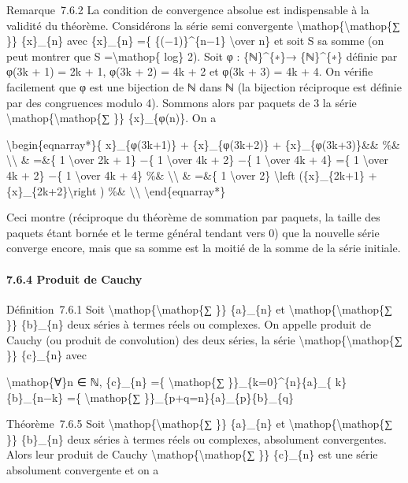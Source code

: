 \documentclass[]{article}
\begin{document}
Remarque~7.6.2 La condition de convergence absolue est indispensable à
la validité du théorème. Considérons la série semi convergente
\textbackslash{}mathop\{\textbackslash{}mathop\{∑ \}\} \{x\}\_\{n\} avec
\{x\}\_\{n\} =\{ \{(−1)\}\^{}\{n−1\} \textbackslash{}over n\} et soit S
sa somme (on peut montrer que S =\textbackslash{}mathop\{ log\} 2). Soit
φ : \{ℕ\}\^{}\{∗\}→ \{ℕ\}\^{}\{∗\} définie par φ(3k + 1) = 2k + 1, φ(3k
+ 2) = 4k + 2 et φ(3k + 3) = 4k + 4. On vérifie facilement que φ est une
bijection de ℕ dans ℕ (la bijection réciproque est définie par des
congruences modulo 4). Sommons alors par paquets de 3 la série
\textbackslash{}mathop\{\textbackslash{}mathop\{∑ \}\} \{x\}\_\{φ(n)\}.
On a

\textbackslash{}begin\{eqnarray*\}\{ x\}\_\{φ(3k+1)\} +
\{x\}\_\{φ(3k+2)\} + \{x\}\_\{φ(3k+3)\}\&\& \%\&
\textbackslash{}\textbackslash{} \& =\&\{ 1 \textbackslash{}over 2k +
1\} −\{ 1 \textbackslash{}over 4k + 2\} −\{ 1 \textbackslash{}over 4k +
4\} =\{ 1 \textbackslash{}over 4k + 2\} −\{ 1 \textbackslash{}over 4k +
4\} \%\& \textbackslash{}\textbackslash{} \& =\&\{ 1
\textbackslash{}over 2\} \textbackslash{}left (\{x\}\_\{2k+1\} +
\{x\}\_\{2k+2\}\textbackslash{}right ) \%\&
\textbackslash{}\textbackslash{} \textbackslash{}end\{eqnarray*\}

Ceci montre (réciproque du théorème de sommation par paquets, la taille
des paquets étant bornée et le terme général tendant vers 0) que la
nouvelle série converge encore, mais que sa somme est la moitié de la
somme de la série initiale.

\paragraph{7.6.4 Produit de Cauchy}

Définition~7.6.1 Soit \textbackslash{}mathop\{\textbackslash{}mathop\{∑
\}\} \{a\}\_\{n\} et \textbackslash{}mathop\{\textbackslash{}mathop\{∑
\}\} \{b\}\_\{n\} deux séries à termes réels ou complexes. On appelle
produit de Cauchy (ou produit de convolution) des deux séries, la série
\textbackslash{}mathop\{\textbackslash{}mathop\{∑ \}\} \{c\}\_\{n\} avec

\textbackslash{}mathop\{∀\}n ∈ ℕ, \{c\}\_\{n\} =\{
\textbackslash{}mathop\{∑ \}\}\_\{k=0\}\^{}\{n\}\{a\}\_\{
k\}\{b\}\_\{n−k\} =\{ \textbackslash{}mathop\{∑
\}\}\_\{p+q=n\}\{a\}\_\{p\}\{b\}\_\{q\}

Théorème~7.6.5 Soit \textbackslash{}mathop\{\textbackslash{}mathop\{∑
\}\} \{a\}\_\{n\} et \textbackslash{}mathop\{\textbackslash{}mathop\{∑
\}\} \{b\}\_\{n\} deux séries à termes réels ou complexes, absolument
convergentes. Alors leur produit de Cauchy
\textbackslash{}mathop\{\textbackslash{}mathop\{∑ \}\} \{c\}\_\{n\} est
une série absolument convergente et on a
\end{document}
